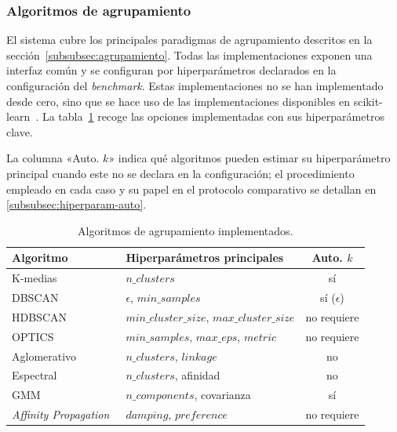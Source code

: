 \subsubsection{Algoritmos de agrupamiento}
\label{subsubsec:algoritmos-agrupamiento}
El sistema cubre los principales paradigmas de agrupamiento descritos en la
sección~\ref{subsubsec:agrupamiento}. Todas las implementaciones exponen una
interfaz común y se configuran por hiperparámetros declarados en la
configuración del \textit{benchmark}. Estas implementaciones no se han
implementado desde cero, sino que se hace uso de las implementaciones
disponibles en scikit-learn~\cite{pedregosa_scikit-learn_2011}. La
tabla~\ref{tab:clustering-algos} recoge las opciones implementadas con sus
hiperparámetros clave.

La columna «Auto. $k$» indica qué algoritmos pueden estimar su hiperparámetro
principal cuando este no se declara en la configuración; el procedimiento
empleado en cada caso y su papel en el protocolo comparativo se detallan en
\ref{subsubsec:hiperparam-auto}.

\begin{table}[h]
  \centering
\begin{tabular}{|l|l|c|} \hline
  \textbf{Algoritmo} & \textbf{Hiperparámetros principales} & \textbf{Auto. $k$} \\ \hline
  K-medias~\cite{arthur_k-means_2007} & $n\_clusters$ & sí \\ \hline
  DBSCAN~\cite{ester_density-based_1996} & $\epsilon$, $min\_samples$ & sí ($\epsilon$) \\ \hline
  HDBSCAN~\cite{campello_density-based_2013} & $min\_cluster\_size$, $max\_cluster\_size$ & no requiere \\ \hline
  OPTICS~\cite{ankerst_optics_1999} & $min\_samples$, $max\_eps$, $metric$ & no requiere \\ \hline
  Aglomerativo~\cite{mullner_modern_2011} & $n\_clusters$, $linkage$ & no \\ \hline
  Espectral~\cite{ng_spectral_2001,huang_ultra-scalable_2020} & $n\_clusters$, afinidad & no \\ \hline
  GMM~\cite{dempster_maximum_1977} & $n\_components$, covarianza & sí \\ \hline
  \textit{Affinity Propagation}~\cite{frey_clustering_2007} & $damping$, $preference$ & no requiere \\ \hline
\end{tabular}
  \caption{Algoritmos de agrupamiento implementados.}
  \label{tab:clustering-algos}
\end{table}

